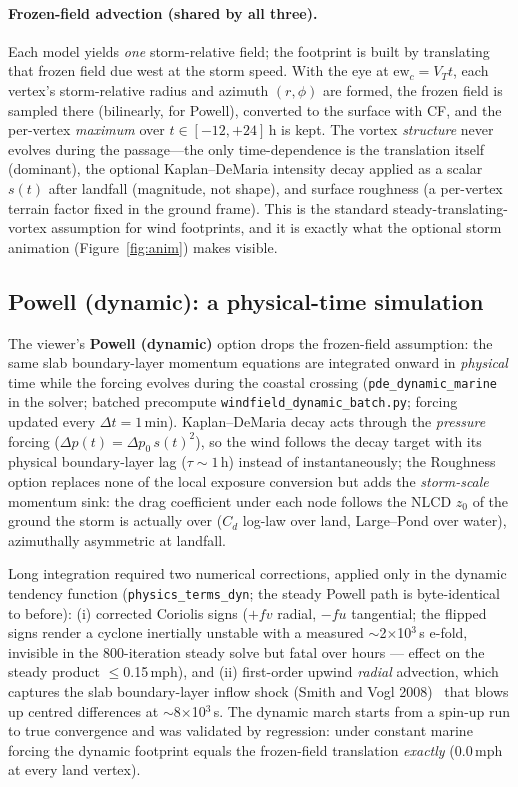 \documentclass[11pt]{article}
\begin{document}
\paragraph{Frozen-field advection (shared by all three).}
Each model yields \emph{one} storm-relative field; the footprint is built by
translating that frozen field due west at the storm speed. With the eye at
$\mathrm{ew}_c=V_T t$, each vertex's storm-relative radius and azimuth $(r,\phi)$ are
formed, the frozen field is sampled there (bilinearly, for Powell), converted to the
surface with CF, and the per-vertex \emph{maximum} over $t\in[-12,+24]$\,h is kept.
The vortex \emph{structure} never evolves during the passage---the only
time-dependence is the translation itself (dominant), the optional Kaplan--DeMaria
intensity decay applied as a scalar $s(t)$ after landfall (magnitude, not shape),
and surface roughness (a per-vertex terrain factor fixed in the ground frame). This
is the standard steady-translating-vortex assumption for wind footprints, and it is
exactly what the optional storm animation (Figure~\ref{fig:anim}) makes visible.

\subsection{Powell (dynamic): a physical-time simulation}\label{sec:powelldyn}
The viewer's \textbf{Powell (dynamic)} option drops the frozen-field assumption: the
same slab boundary-layer momentum equations are integrated onward in \emph{physical}
time while the forcing evolves during the coastal crossing
(\texttt{pde\_dynamic\_marine} in the solver; batched precompute
\texttt{windfield\_dynamic\_batch.py}; forcing updated every $\Delta t=1$\,min).
Kaplan--DeMaria decay acts through the \emph{pressure} forcing
($\Delta p(t)=\Delta p_0\,s(t)^2$), so the wind follows the decay target with its
physical boundary-layer lag ($\tau\!\sim\!1$\,h) instead of instantaneously; the
Roughness option replaces none of the local exposure conversion but adds the
\emph{storm-scale} momentum sink: the drag coefficient under each node follows the
NLCD $z_0$ of the ground the storm is actually over ($C_d$ log-law over land,
Large--Pond over water), azimuthally asymmetric at landfall.

Long integration required two numerical corrections, applied only in the dynamic
tendency function (\texttt{physics\_terms\_dyn}; the steady Powell path is
byte-identical to before): (i) corrected Coriolis signs ($+fv$ radial, $-fu$
tangential; the flipped signs render a cyclone inertially unstable with a measured
$\sim$2$\times$10$^3$\,s e-fold, invisible in the 800-iteration steady solve but
fatal over hours --- effect on the steady product $\le$0.15\,mph), and (ii)
first-order upwind \emph{radial} advection, which captures the slab boundary-layer
inflow shock (Smith and Vogl 2008)~\cite{smithvogl} that blows up centred differences at
$\sim$8$\times$10$^3$\,s. The dynamic march starts from a spin-up run to true
convergence and was validated by regression: under constant marine forcing the
dynamic footprint equals the frozen-field translation \emph{exactly} (0.0\,mph at
every land vertex).
\end{document}
